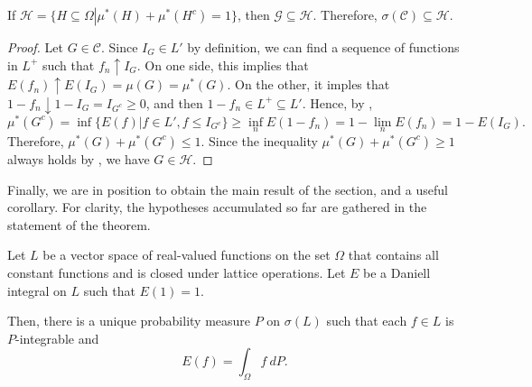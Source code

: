 \begin{lemm}\label{lemma:Hcal contains Ccal}
		If \(\mathcal{H}=\{H\subseteq\Omega\left|\mu^*(H)+\mu^*(H^c)=1\right.\}\), then \(\mathcal{G}\subseteq\mathcal{H}\). Therefore, \(\sigma(\mathcal{C})\subseteq\mathcal{H}\).
\end{lemm}
\begin{proof}
		Let \(G\in\mathcal{C}\). Since \(I_G\in L'\) by definition, we can find a sequence of functions in \(L^{+}\) such that \(f_n\uparrow I_G\). On one side, this implies that \(E(f_n)\uparrow E(I_G)=\mu(G)=\mu^*(G)\). On the other, it imples that \(1-f_n\downarrow 1-I_{G}=I_{G^c}\geq 0\), and then \(1-f_n\in L^{+}\subseteq L'\). Hence, by ,
		\[
				\mu^*(G^c)=\inf\{E(f)\left|f\in L', f\leq I_{G^c}\right.\}\geq\inf_nE(1-f_n)=1-\lim_nE(f_n)=1-E(I_G)
		.\]
		Therefore, \(\mu^*(G)+\mu^*(G^c)\leq 1\). Since the inequality \(\mu^*(G)+\mu^*(G^c)\geq 1\) always holds by , we have \(G\in\mathcal{H}\).
\end{proof}
Finally, we are in position to obtain the main result of the section, and a useful corollary. For clarity, the hypotheses accumulated so far are gathered in the statement of the theorem.
\begin{thrm}\label{theorem:Daniell Representation}
		Let \(L\) be a vector space of real-valued functions on the set \(\Omega\) that contains all constant functions and is closed under lattice operations. Let \(E\) be a Daniell integral on \(L\) such that \(E(1)=1\).

		Then, there is a unique probability measure \(P\) on \(\sigma(L)\) such that each \(f\in L\) is \(P\)-integrable and
		\[
				E(f)=\int_{\Omega}f~dP
		.\]
\end{thrm}
